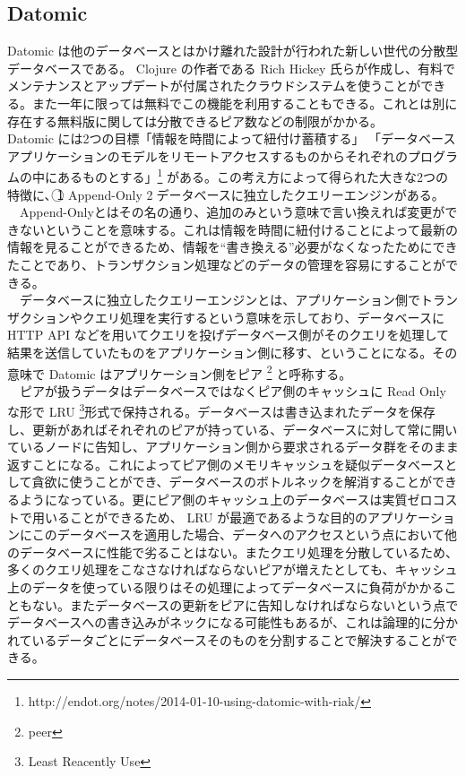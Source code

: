 \documentclass{scrartcl}
\begin{document}
\subsection{Datomic}
\label{sec:org34c31ad}
 Datomic は他のデータベースとはかけ離れた設計が行われた新しい世代の分散型データベースである。 Clojure の作者である Rich Hickey 氏らが作成し、有料でメンテナンスとアップデートが付属されたクラウドシステムを使うことができる。また一年に限っては無料でこの機能を利用することもできる。これとは別に存在する無料版に関しては分散できるピア数などの制限がかかる。\\
  Datomic には2つの目標「情報を時間によって紐付け蓄積する」 「データベースアプリケーションのモデルをリモートアクセスするものからそれぞれのプログラムの中にあるものとする」\footnote{http://endot.org/notes/2014-01-10-using-datomic-with-riak/} がある。この考え方によって得られた大きな2つの特徴に、\textcircled{\scriptsize 1} Append-Only \textcircled{\scriptsize 2}データベースに独立したクエリーエンジンがある。\\
　Append-Onlyとはその名の通り、追加のみという意味で言い換えれば変更ができないということを意味する。これは情報を時間に紐付けることによって最新の情報を見ることができるため、情報を``書き換える''必要がなくなったためにできたことであり、トランザクション処理などのデータの管理を容易にすることができる。\\
　データベースに独立したクエリーエンジンとは、アプリケーション側でトランザクションやクエリ処理を実行するという意味を示しており、データベースに HTTP API などを用いてクエリを投げデータベース側がそのクエリを処理して結果を送信していたものをアプリケーション側に移す、ということになる。その意味で Datomic はアプリケーション側をピア \footnote{peer} と呼称する。\\
　ピアが扱うデータはデータベースではなくピア側のキャッシュに Read Only な形で LRU \footnote{Least Reacently Use}形式で保持される。データベースは書き込まれたデータを保存し、更新があればそれぞれのピアが持っている、データベースに対して常に開いているノードに告知し、アプリケーション側から要求されるデータ群をそのまま返すことになる。これによってピア側のメモリキャッシュを疑似データベースとして貪欲に使うことができ、データベースのボトルネックを解消することができるようになっている。更にピア側のキャッシュ上のデータベースは実質ゼロコストで用いることができるため、 LRU が最適であるような目的のアプリケーションにこのデータベースを適用した場合、データへのアクセスという点において他のデータベースに性能で劣ることはない。またクエリ処理を分散しているため、多くのクエリ処理をこなさなければならないピアが増えたとしても、キャッシュ上のデータを使っている限りはその処理によってデータベースに負荷がかかることもない。またデータベースの更新をピアに告知しなければならないという点でデータベースへの書き込みがネックになる可能性もあるが、これは論理的に分かれているデータごとにデータベースそのものを分割することで解決することができる。\\
\end{document}
